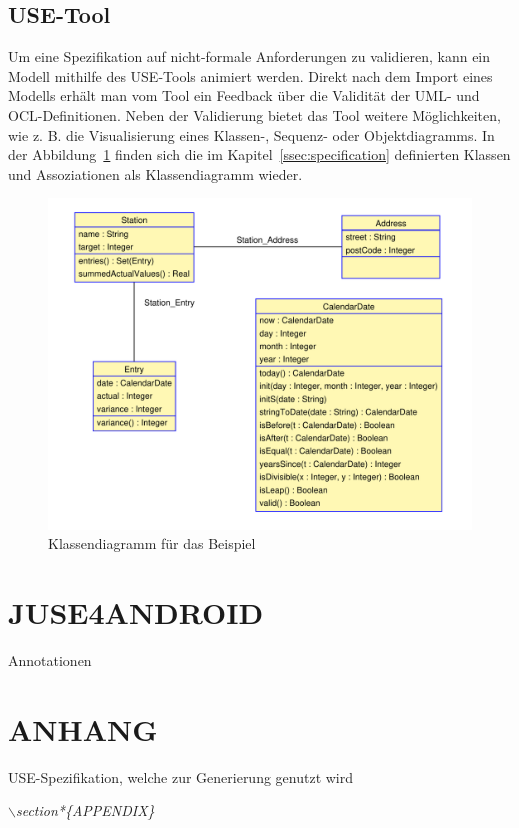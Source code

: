 \documentclass[a4paper,twoside]{article}
\begin{document}
\subsection{USE-Tool}

Um eine Spezifikation auf nicht-formale Anforderungen zu validieren, kann ein Modell mithilfe des USE-Tools animiert werden. Direkt nach dem Import eines Modells erhält man vom Tool ein Feedback über die Validität der UML- und OCL-Definitionen. Neben der Validierung bietet das Tool weitere Möglichkeiten, wie z. B. die Visualisierung eines Klassen-, Sequenz- oder Objektdiagramms. In der Abbildung~\ref{fig:Grafik2} finden sich die im Kapitel~\ref{ssec:specification} definierten Klassen und Assoziationen als Klassendiagramm wieder.

\begin{figure}[!h]
	\includegraphics[scale=.4]{pics/USE_class_diagramm.pdf}
	\caption{Klassendiagramm für das Beispiel}
	\label{fig:Grafik2}
\end{figure}


\section{\uppercase{JUSE4Android}}

Annotationen 
\vfill

{\small
}

\section*{\uppercase{Anhang}}

\noindent 
USE-Spezifikation, welche zur Generierung genutzt wird

\textit{$\backslash$section*\{APPENDIX\}}


\vfill
\end{document}
